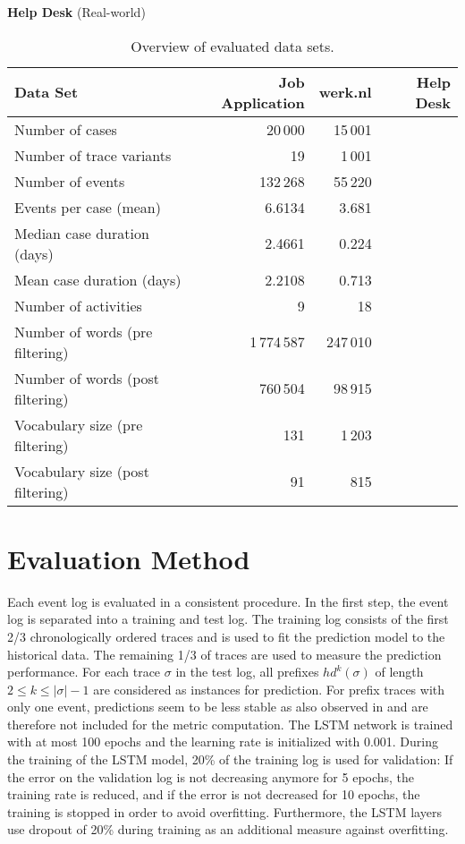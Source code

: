  
\textbf{Help Desk} (Real-world)

\begin{table}[!htbp]
	\begin{tabularx}{\textwidth}{l r r r}
		\toprule
		\textbf{Data Set} & \textbf{Job Application} & \textbf{werk.nl} &\textbf{Help Desk}  \\
		\midrule
		Number of cases & 20\,000& 15\,001& \\
		Number of trace variants &19 & 1\,001 & \\
		Number of events & 132\,268 & 55\,220 & \\
		Events per case (mean) & 6.6134& 3.681& \\
		Median case duration (days) & 2.4661 & 0.224& \\
		Mean case duration (days)&2.2108 &  0.713 & \\
		Number of activities & 9 & 18 & \\
		Number of words (pre filtering) & 1\,774\,587 &247\,010 & \\
		Number of words (post filtering)  & 760\,504 &98\,915 & \\
		Vocabulary size (pre filtering) &131 & 1\,203 & \\
		Vocabulary size (post filtering) & 91 & 815 & \\
		\bottomrule
	\end{tabularx}
	\caption[Overview of evaluated data sets]{Overview of evaluated data sets.}
	\label{tab:logs}
\end{table}

\section{Evaluation Method}

Each event log is evaluated in a consistent procedure.
In the first step, the event log is separated into a training and test log. 
The training log consists of the first 2/3 chronologically ordered traces and is used to fit the prediction model to the historical data.
The remaining 1/3 of traces are used to measure the prediction performance.
For each trace $\sigma$ in the test log, all prefixes $hd^k(\sigma)$ of length $2 \leq k \leq |\sigma| - 1$ are considered as instances for prediction.
For prefix traces with only one event, predictions seem to be less stable as also observed in \cite{DBLP:conf/caise/TaxVRD17} and are therefore not included for the metric computation.
The LSTM network is trained with at most 100 epochs and the learning rate is initialized with 0.001.
During the training of the LSTM model, 20\% of the training log is used for validation: If the error on the validation log is not decreasing anymore for 5 epochs, the training rate is reduced, and if the error is not decreased for 10 epochs, the training is stopped in order to avoid overfitting.
Furthermore, the LSTM layers use dropout \cite{DBLP:journals/corr/abs-1207-0580} of 20\% during training as an additional measure against overfitting.

